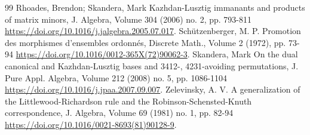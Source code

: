 \begin{thebibliography}{99}
 Rhoades, Brendon; Skandera, Mark Kazhdan-Lusztig immanants and products of matrix minors, J. Algebra, Volume 304 (2006) no. 2, pp. 793-811 \url{https://doi.org/10.1016/j.jalgebra.2005.07.017}.
 Schützenberger, M. P. Promotion des morphismes d’ensembles ordonnés, Discrete Math., Volume 2 (1972), pp. 73-94 \url{https://doi.org/10.1016/0012-365X(72)90062-3}.
 Skandera, Mark On the dual canonical and Kazhdan-Lusztig bases and 3412-, 4231-avoiding permutations, J. Pure Appl. Algebra, Volume 212 (2008) no. 5, pp. 1086-1104 \url{https://doi.org/10.1016/j.jpaa.2007.09.007}.
 Zelevinsky, A. V. A generalization of the Littlewood-Richardson rule and the Robinson-Schensted-Knuth correspondence, J. Algebra, Volume 69 (1981) no. 1, pp. 82-94 \url{https://doi.org/10.1016/0021-8693(81)90128-9}.
\end{thebibliography}
